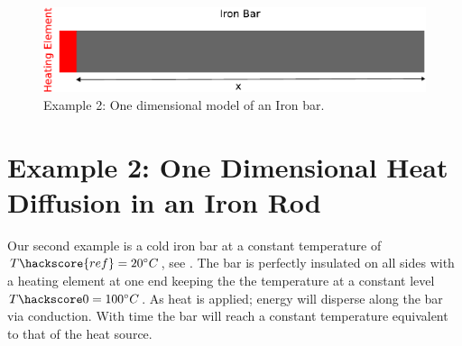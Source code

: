 
%
%
%
\begin{figure}[ht]
\centerline{\includegraphics[width=4.in]{figures/onedheatdiff002}}
\caption{Example 2: One dimensional model of an Iron bar.}
\label{fig:onedhdmodel}
\end{figure}

\section{Example 2: One Dimensional Heat Diffusion in an Iron Rod}
\label{Sec:1DHDv0}

Our second example is a cold iron bar at a constant temperature of $T\hackscore{ref}=20^{\circ} C$, see . The bar is perfectly insulated on all sides with a heating element at one end keeping the the temperature at a constant level $T\hackscore0=100^{\circ} C$.  As heat is applied; energy will disperse along the bar via conduction. With time the bar will reach a constant temperature equivalent to that of the heat source.

